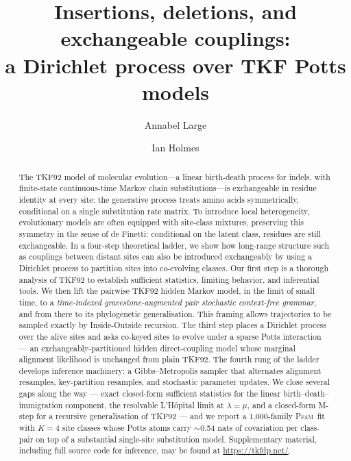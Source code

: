 \documentclass[11pt]{article}
\title{Insertions, deletions, and exchangeable couplings:\\
       a Dirichlet process over TKF Potts models}
\author{Annabel Large}
\author{Ian Holmes}
\affil{Department of Bioengineering, University of California, Berkeley\\
       \texttt{\{annabel\_large, ihh\}@berkeley.edu}}
\date{}
\theoremstyle{definition}
\theoremstyle{remark}
\newcommand{\Pfam}{\textsc{Pfam}}
\begin{document}
\maketitle

\begin{abstract}
\noindent
The TKF92 model of molecular evolution---a linear birth-death process for indels, with finite-state continuous-time Markov chain substitutions---is exchangeable in residue identity at every site: the
generative process treats amino acids symmetrically, conditional on a single
substitution rate matrix.
To introduce local heterogeneity,
evolutionary models are often equipped with site-class mixtures,
preserving this symmetry in the sense of de Finetti: conditional on the latent class, residues are still exchangeable.
In a four-step theoretical ladder, we show how long-range structure such as couplings between
distant sites can also be introduced exchangeably by using a Dirichlet process to partition sites into co-evolving classes.
Our first step is a thorough analysis of TKF92 to establish sufficient statistics, limiting behavior, and inferential tools.
We then lift the pairwise TKF92 hidden Markov model, in the limit of
small time, to a \emph{time-indexed gravestone-augmented pair stochastic
context-free grammar}, and from there to its phylogenetic generalisation.
This framing allows trajectories to be sampled exactly by Inside-Outside recursion.
The third step places a Dirichlet process over the alive sites and asks
co-keyed sites to evolve under a sparse Potts interaction --- an
exchangeably-partitioned hidden direct-coupling model whose marginal
alignment likelihood is unchanged from plain TKF92.
The fourth rung of the ladder develops inference machinery:
a Gibbs--Metropolis sampler that alternates alignment resamples,
key-partition resamples, and stochastic parameter updates. We close
several gaps along the way --- exact closed-form sufficient statistics
for the linear birth--death--immigration component, the resolvable
L'H\^opital limit at $\lambda{=}\mu$, and a closed-form M-step for a
recursive generalisation of TKF92 --- and we report a 1{,}000-family
\Pfam\ fit with $K{=}4$ site classes whose Potts atoms carry
$\sim$0.54 nats of covariation per class-pair on top of a substantial
single-site substitution model.
Supplementary material, including full source code for inference, may be found at \url{https://tkfdp.net/}.
\end{abstract}

\end{document}
